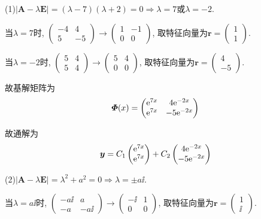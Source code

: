 \begin{solve}
(1)$|\bm{A}-\lambda\bm{E}|=(\lambda-7)(\lambda+2)=0\Rightarrow\lambda=7$或$\lambda=-2$.

当$\lambda=7$时, $\begin{pmatrix}-4&4\\5&-5\end{pmatrix}\to\begin{pmatrix}1&-1\\0&0\end{pmatrix}$, 
取特征向量为$\bm{r}=\begin{pmatrix}1\\1\end{pmatrix}.$

当$\lambda=-2$时, $\begin{pmatrix}5&4\\5&4\end{pmatrix}\to\begin{pmatrix}5&4\\0&0\end{pmatrix}$, 
取特征向量为$\bm{r}=\begin{pmatrix}4\\-5\end{pmatrix}.$

故基解矩阵为
\[\bm{\varPhi}(x)=\begin{pmatrix}\mathrm{e}^{7x}&4\mathrm{e}^{-2x}\\\mathrm{e}^{7x}&-5\mathrm{e}^{-2x}\end{pmatrix}\]

故通解为
\[\bm{y}=C_1\begin{pmatrix}\mathrm{e}^{7x}\\\mathrm{e}^{7x}\end{pmatrix}+C_2\begin{pmatrix}4\mathrm{e}^{-2x}\\-5\mathrm{e}^{-2x}\end{pmatrix}\]

(2)$|\bm{A}-\lambda\bm{E}|=\lambda^2+a^2=0\Rightarrow\lambda=\pm a\ii$.

当$\lambda=a\ii$时, $\begin{pmatrix}-a\ii&a\\-a&-a\ii\end{pmatrix}\to\begin{pmatrix}-\ii&1\\0&0\end{pmatrix}$, 
取特征向量为$\bm{r}=\begin{pmatrix}1\\\ii\end{pmatrix}$.


\end{solve}
